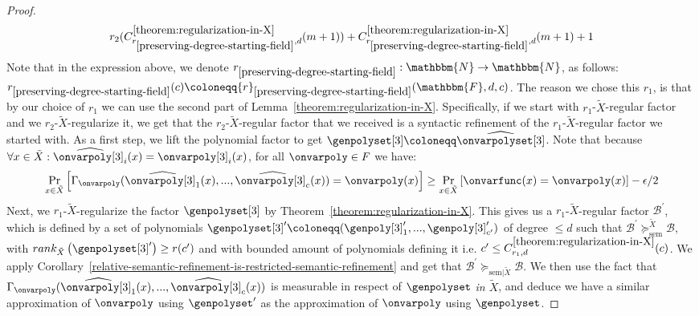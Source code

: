 \documentclass[10pt,a4paper]{article}
\newcommand{\definedas}[0]{\coloneqq}
\newcommand{\parens}[1]{\left( #1 \right)}
\newcommand{\basefield}[0]{\mathbbm{F}}
\newcommand{\degree}[0]{d}
\newcommand{\funcdef}[3]{#1:#2\rightarrow#3}
\newcommand{\factor}[0]{\mathcal{B}}
\newcommand{\semrefineex}[1]{\succeq_{\text{sem}|#1}}
\newcommand{\relsemrefine}[1]{\succeq^{#1}_{\text{sem}}}
\newcommand{\naturalnumbersset}[0]{\mathbbm{N}}
\newcommand{\variety}{{\tilde{X}}}
\newcommand{\lift}[1]{\widehat{#1}}
\newcommand{\relrank}[2]{rank_{#1} \parens{#2}}
\newcommand{\rankfunc}[0]{{{{r}}}}
\newcommand{\prex}[2]{\Pr_{#1}\left[ #2 \right]}
\begin{document}
\begin{proof}
\[{{            {\rankfunc_2(C_{\rankfunc_{\ref{preserving-degree-starting-field}}, \degree}^{\ref{theorem:regularization-in-X}}(m + 1))
            + C_{\rankfunc_{\ref{preserving-degree-starting-field}}, \degree}^{\ref{theorem:regularization-in-X}}(m + 1) + 1}
        }}
    \]
    Note that in the expression above, we denote $\funcdef{\rankfunc_{\ref{preserving-degree-starting-field}}}{\naturalnumbersset}{\naturalnumbersset}$,
    as follows: $\rankfunc_{\ref{preserving-degree-starting-field}}(c) \definedas \rankfunc_{\ref{preserving-degree-starting-field}}(\basefield, \degree, c)$.
    \newline
    The reason we chose this $\rankfunc_1$, is that by our choice of $\rankfunc_1$ we can use the second part of Lemma~\ref{theorem:regularization-in-X}.
    Specifically, if we start with $\rankfunc_1$-$\variety$-regular factor and we $\rankfunc_2$-$\variety$-regularize it,
    we get that the $\rankfunc_2$-$\variety$-regular factor that we received is a syntactic refinement of the $\rankfunc_1$-$\variety$-regular factor we started with.
    \newline
    As a first step, we lift the polynomial factor to get $\genpolyset[3] \definedas \lift{\onvarpolyset[3]}$.
    Note that because $\forall x \in \variety: \lift{\onvarpoly[3]_i}(x) = \onvarpoly[3]_i(x)$, for all $\onvarpoly \in F$ we have:
    \[
        \prex{x \in \variety}{\Gamma_{\onvarpoly}(\lift{\onvarpoly[3]_1}(x),...,\lift{\onvarpoly[3]_c}(x)) = \onvarpoly(x)} \geq \prex{x \in \variety}{\onvarfunc(x) = \onvarpoly(x)} - \epsilon / 2
    \]
    Next, we $\rankfunc_1$-$\variety$-regularize the factor $\genpolyset[3]$ by Theorem~\ref{theorem:regularization-in-X}.
    This gives us a $\rankfunc_1$-$\variety$-regular factor $\factor^\prime$, which is defined by a set of polynomials $\genpolyset[3]^\prime \definedas (\genpoly[3]^\prime_1,...,\genpoly[3]^\prime_{c^\prime})$ of degree $\leq \degree$
    such that $\factor^\prime \relsemrefine{\variety} \factor$,
    with $\relrank{\variety}{\genpolyset[3]^\prime} \geq \rankfunc(c^\prime)$
    and with bounded amount of polynomials defining it i.e. $c^\prime \leq C_{\rankfunc_1, \degree}^{\ref{theorem:regularization-in-X}}(c)$.
    We apply Corollary~\ref{relative-semantic-refinement-is-restricted-semantic-refinement}
    and get that $\factor^{\prime} \semrefineex{\variety} \factor$.
    We then use the fact that $\Gamma_{\onvarpoly}(\lift{\onvarpoly[3]_1}(x),...,\lift{\onvarpoly[3]_c}(x))$ is measurable in respect of $\genpolyset$ \emph{in $\variety$},
    and deduce we have a similar approximation of $\onvarpoly$ using $\genpolyset^\prime$ as the approximation of $\onvarpoly$ using $\genpolyset$.

\end{proof}
\end{document}
